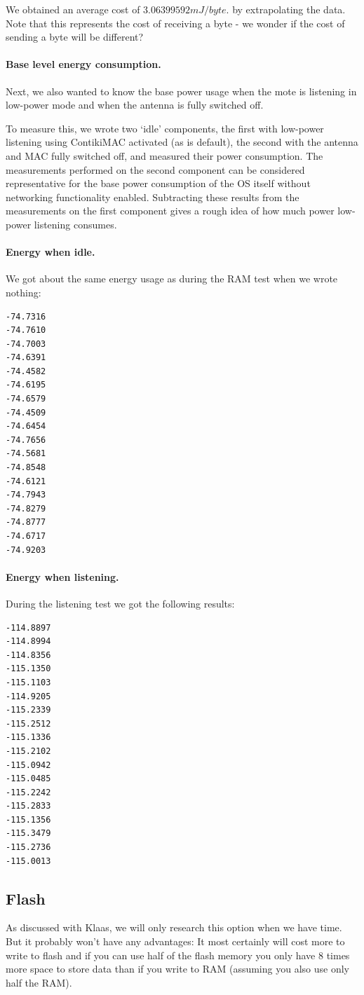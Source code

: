 \documentclass{article} \usepackage[utf8]{inputenc}
\begin{document}
We obtained an average cost of $3.06399592 mJ/byte.$ by
extrapolating the data. Note that this represents the cost of
receiving a byte - we wonder if the cost of sending a byte will be
different?

\paragraph{Base level energy consumption.} Next, we also wanted to
know the base power usage when the mote is listening in low-power mode
and when the antenna is fully switched off.

To measure this, we wrote two `idle' components, the first with
low-power listening using ContikiMAC activated (as is default), the
second with the antenna and MAC fully switched off, and measured their
power consumption. The measurements performed on the second component
can be considered representative for the base power consumption of the
OS itself without networking functionality enabled. Subtracting these
results from the measurements on the first component gives a rough
idea of how much power low-power listening consumes.

\paragraph{Energy when idle.}
We got about the same energy usage as during the RAM test when we
wrote nothing:

\begin{verbatim}
-74.7316
-74.7610
-74.7003
-74.6391
-74.4582
-74.6195
-74.6579
-74.4509
-74.6454
-74.7656
-74.5681
-74.8548
-74.6121
-74.7943
-74.8279
-74.8777
-74.6717
-74.9203
\end{verbatim}


\paragraph{Energy when listening.}
During the listening test we got the following results:

\begin{verbatim}
-114.8897
-114.8994
-114.8356
-115.1350
-115.1103
-114.9205
-115.2339
-115.2512
-115.1336
-115.2102
-115.0942
-115.0485
-115.2242
-115.2833
-115.1356
-115.3479
-115.2736
-115.0013
\end{verbatim}

\subsection{Flash}
As discussed with Klaas, we will only research this option when we
have time. But it probably won't have any advantages: It most
certainly will cost more to write to flash and if you can use half of
the flash memory you only have 8 times more space to store data than
if you write to RAM (assuming you also use only half the RAM).
\end{document}
